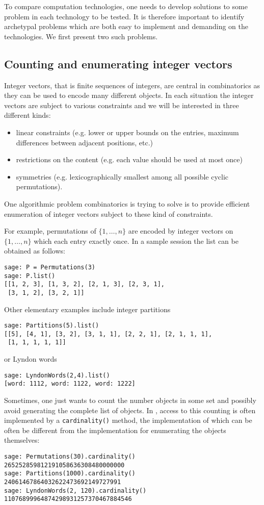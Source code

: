 \documentclass{deliverablereport}
\begin{document}
To compare computation technologies, one needs to develop solutions to some problem in
each technology to be tested. It is therefore important to identify archetypal
problems which are both easy to implement and demanding on the technologies.
We first present two such problems.

\subsection{Counting and enumerating integer vectors}
\label{subsec:intro:integer:vectors}

Integer vectors, that is finite sequences of integers, are central
in combinatorics as they can be used to encode many different
objects. In each situation the integer vectors are subject to various
constraints and we will be interested in three different kinds:
\begin{itemize}
\item linear constraints (e.g. lower or upper bounds on the entries,
maximum differences between adjacent positions, etc.)
\item restrictions on the content (e.g. each value should be used
at most once)
\item symmetries (e.g. lexicographically smallest among all possible
cyclic permutations).
\end{itemize}
One algorithmic problem combinatorics is trying to solve is to provide
efficient enumeration of integer vectors subject to these kind of
constraints.

For example, permutations of $\{1, \ldots, n\}$ are encoded by integer vectors
on $\{1, \ldots, n\}$ which each entry exactly once. In a sample
\Sage session the list can be obtained as follows:
\begin{verbatim}
sage: P = Permutations(3)
sage: P.list()
[[1, 2, 3], [1, 3, 2], [2, 1, 3], [2, 3, 1],
 [3, 1, 2], [3, 2, 1]]
\end{verbatim}
Other elementary examples include integer partitions
\begin{verbatim}
sage: Partitions(5).list()
[[5], [4, 1], [3, 2], [3, 1, 1], [2, 2, 1], [2, 1, 1, 1],
 [1, 1, 1, 1, 1]]
\end{verbatim}
or Lyndon words
\begin{verbatim}
sage: LyndonWords(2,4).list()
[word: 1112, word: 1122, word: 1222]
\end{verbatim}

Sometimes, one just wants to count the number objects in some set and possibly
avoid generating the complete list of objects. In \Sage, access to this
counting is often implemented by a {\tt cardinality()} method, the
implementation of which can be often be different from the implementation for
enumerating the objects themselves:
\begin{verbatim}
sage: Permutations(30).cardinality()
265252859812191058636308480000000
sage: Partitions(1000).cardinality()
24061467864032622473692149727991
sage: LyndonWords(2, 120).cardinality()
11076899964874298931257370467884546
\end{verbatim}
\end{document}
